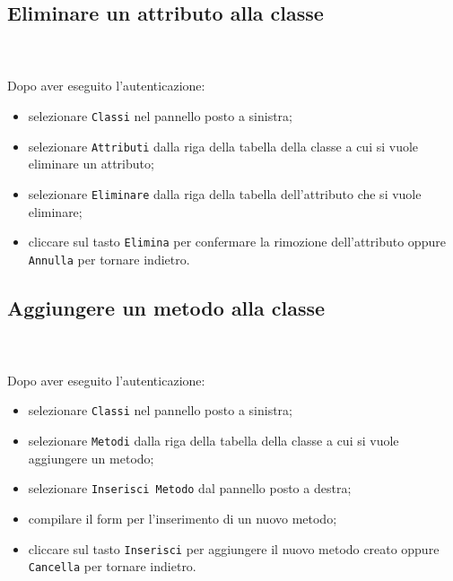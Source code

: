 	\subsection{Eliminare un attributo alla classe} \mbox{}\\ \mbox{}\\
	Dopo aver eseguito l'autenticazione:
	\begin{itemize}
		\item selezionare \texttt{Classi} nel pannello posto a sinistra;
		\item selezionare \texttt{Attributi} dalla riga della tabella della 
		classe
		a cui si vuole eliminare un attributo;\
		\item selezionare \texttt{Eliminare} dalla riga della tabella 
		dell'attributo 
		che si vuole eliminare;
		\item cliccare sul tasto \texttt{Elimina} per confermare la rimozione 
		dell'attributo
		oppure \texttt{Annulla} per tornare indietro.
	\end{itemize}
	
	\subsection{Aggiungere un metodo alla classe} \mbox{}\\ \mbox{}\\
	Dopo aver eseguito l'autenticazione:
	\begin{itemize}
		\item selezionare \texttt{Classi} nel pannello posto a sinistra;
		\item selezionare \texttt{Metodi} dalla riga della tabella della classe
		a cui si vuole aggiungere un metodo;
		\item selezionare \texttt{Inserisci Metodo} dal pannello posto a destra;
		\item compilare il form per l'inserimento di un nuovo metodo;
		\item cliccare sul tasto \texttt{Inserisci} per aggiungere il nuovo 
		metodo 
		creato oppure \texttt{Cancella} per tornare indietro.	
	\end{itemize}
	
